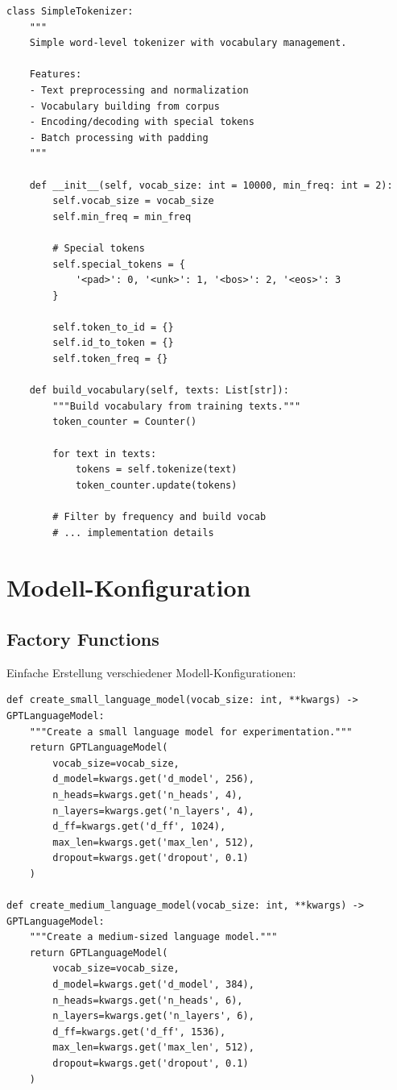 \begin{lstlisting}[style=pythonstyle, caption=Tokenizer Implementation]
class SimpleTokenizer:
    """
    Simple word-level tokenizer with vocabulary management.
    
    Features:
    - Text preprocessing and normalization
    - Vocabulary building from corpus
    - Encoding/decoding with special tokens
    - Batch processing with padding
    """
    
    def __init__(self, vocab_size: int = 10000, min_freq: int = 2):
        self.vocab_size = vocab_size
        self.min_freq = min_freq
        
        # Special tokens
        self.special_tokens = {
            '<pad>': 0, '<unk>': 1, '<bos>': 2, '<eos>': 3
        }
        
        self.token_to_id = {}
        self.id_to_token = {}
        self.token_freq = {}
    
    def build_vocabulary(self, texts: List[str]):
        """Build vocabulary from training texts."""
        token_counter = Counter()
        
        for text in texts:
            tokens = self.tokenize(text)
            token_counter.update(tokens)
        
        # Filter by frequency and build vocab
        # ... implementation details
\end{lstlisting}

\section{Modell-Konfiguration}

\subsection{Factory Functions}

Einfache Erstellung verschiedener Modell-Konfigurationen:

\begin{lstlisting}[style=pythonstyle, caption=Model Factory Functions]
def create_small_language_model(vocab_size: int, **kwargs) -> GPTLanguageModel:
    """Create a small language model for experimentation."""
    return GPTLanguageModel(
        vocab_size=vocab_size,
        d_model=kwargs.get('d_model', 256),
        n_heads=kwargs.get('n_heads', 4),
        n_layers=kwargs.get('n_layers', 4),
        d_ff=kwargs.get('d_ff', 1024),
        max_len=kwargs.get('max_len', 512),
        dropout=kwargs.get('dropout', 0.1)
    )

def create_medium_language_model(vocab_size: int, **kwargs) -> GPTLanguageModel:
    """Create a medium-sized language model."""
    return GPTLanguageModel(
        vocab_size=vocab_size,
        d_model=kwargs.get('d_model', 384),
        n_heads=kwargs.get('n_heads', 6),
        n_layers=kwargs.get('n_layers', 6),
        d_ff=kwargs.get('d_ff', 1536),
        max_len=kwargs.get('max_len', 512),
        dropout=kwargs.get('dropout', 0.1)
    )
\end{lstlisting}


